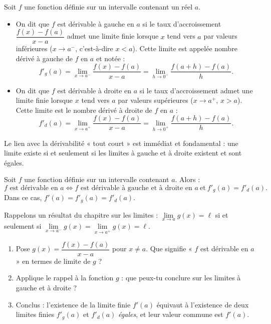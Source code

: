 \documentclass[11pt]{article}
\newcommand{\cle}[1]{{\popxbold\color{popdark}#1}}
\begin{document}
\begin{definition}
Soit $f$ une fonction définie sur un intervalle contenant un réel $a$.
\begin{itemize}
\item On dit que $f$ est \cle{dérivable à gauche} en $a$ si le taux d'accroissement $\dfrac{f(x)-f(a)}{x-a}$ admet une limite finie lorsque $x$ tend vers $a$ par valeurs inférieures ($x \to a^{-}$, c'est-à-dire $x < a$). Cette limite est appelée \cle{nombre dérivé à gauche} de $f$ en $a$ et notée :
\[ f'_{g}(a) = \lim_{x \to a^{-}} \frac{f(x)-f(a)}{x-a} = \lim_{h \to 0^{-}} \frac{f(a+h)-f(a)}{h}. \]
\item On dit que $f$ est \cle{dérivable à droite} en $a$ si le taux d'accroissement admet une limite finie lorsque $x$ tend vers $a$ par valeurs supérieures ($x \to a^{+}$, $x > a$). Cette limite est le \cle{nombre dérivé à droite} de $f$ en $a$ :
\[ f'_{d}(a) = \lim_{x \to a^{+}} \frac{f(x)-f(a)}{x-a} = \lim_{h \to 0^{+}} \frac{f(a+h)-f(a)}{h}. \]
\end{itemize}
\end{definition}

Le lien avec la dérivabilité « tout court » est immédiat et fondamental : une limite existe si et seulement si les limites à gauche et à droite existent et sont égales.

\begin{propriete}
Soit $f$ une fonction définie sur un intervalle contenant $a$. Alors :
\[ f \text{ est dérivable en } a \iff f \text{ est dérivable à gauche et à droite en } a \ \text{et}\ f'_{g}(a) = f'_{d}(a). \]
Dans ce cas, $f'(a) = f'_{g}(a) = f'_{d}(a)$.
\end{propriete}

\begin{experience}
Rappelons un résultat du chapitre sur les limites : $\lim\limits_{x \to a} g(x) = \ell$ si et seulement si $\lim\limits_{x \to a^{-}} g(x) = \lim\limits_{x \to a^{+}} g(x) = \ell$.
\begin{enumerate}
\item Pose $g(x) = \dfrac{f(x)-f(a)}{x-a}$ pour $x \neq a$. Que signifie « $f$ est dérivable en $a$ » en termes de limite de $g$ ?
\item Applique le rappel à la fonction $g$ : que peux-tu conclure sur les limites à gauche et à droite ?
\item Conclus : l'existence de la limite finie $f'(a)$ équivaut à l'existence de deux limites finies $f'_g(a)$ et $f'_d(a)$ \emph{égales}, et leur valeur commune est $f'(a)$.
\end{enumerate}
\end{experience}
\end{document}

